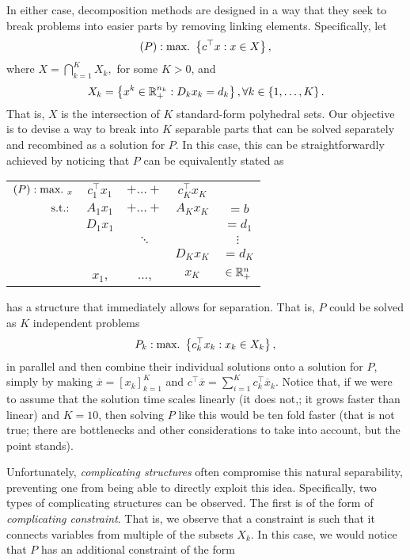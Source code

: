 In either case, decomposition methods are designed in a way that they seek to break problems into easier parts by removing linking elements. Specifically, let 
%
\begin{equation*}
	(P) : \mathop{\text{max.~}} \left\{ c^\top x : x \in X \right \},
\end{equation*}
%
where $X = \bigcap_{k=1}^K X_k,$ for some $K > 0$, and 
%
\begin{equation*}
	X_k = \left\{ x^k \in \mathbb{R}_+^{n_k} : D_kx_k = d_k \right \}, \forall k \in \left\{ 1,\dots,K \right \}.	
\end{equation*}
%
That is, $X$ is the intersection of $K$ standard-form polyhedral sets. Our objective is to devise a way to break into $K$ separable parts that can be solved separately and recombined as a solution for $P$. In this case, this can be straightforwardly achieved by noticing that $P$ can be equivalently stated as 
%
\begin{center}
    \begin{tabular}{rcccc}
	$(P): \mathop{\text{max.~}}_x$ & $c_1^\top x_1$ & $+\dots+$ & $c_K^\top x_K$ & \\
	        $\mathop{\text{s.t.:~}}$  & $A_1x_1$ & $+\dots+$ & $A_Kx_K$ & $=b$ \\
	               & $D_1x_1$ &           &          & $= d_1$ \\
	               &          & $\ddots$  &          & $\vdots$ \\
	               &          &           & $D_Kx_K$ & $= d_K$ \\
	               &  $x_1$,  & $\dots$,  & $x_K$    & $\in \mathbb{R}^n_+$ 
	\end{tabular}
\end{center}
%
has a structure that immediately allows for separation. That is, $P$ could be solved as $K$ independent problems 
%
\begin{equation*}
	P_k : \mathop{\text{max.~}} \left\{ c_k^\top x_k : x_k \in X_k \right \},	
\end{equation*}
%
in parallel and then combine their individual solutions onto a solution for $P$, simply by making $\overline{x} = [x_k]_{k=1}^K$ and $c^\top \overline{x} = \sum_{i=1}^K c_k^\top \overline{x}_k$. Notice that, if we were to assume that the solution time scales linearly (it does not,; it grows faster than linear) and $K=10$, then solving $P$ like this would be ten fold faster (that is not true; there are bottlenecks and other considerations to take into account, but the point stands). 

Unfortunately, \emph{complicating structures} often compromise this natural separability, preventing one from being able to directly exploit this idea. Specifically, two types of complicating structures can be observed. The first is of the form of \emph{complicating constraint}. That is, we observe that a constraint is such that it connects variables from multiple of the subsets $X_k$. In this case, we would notice that $P$ has an additional constraint of the form

